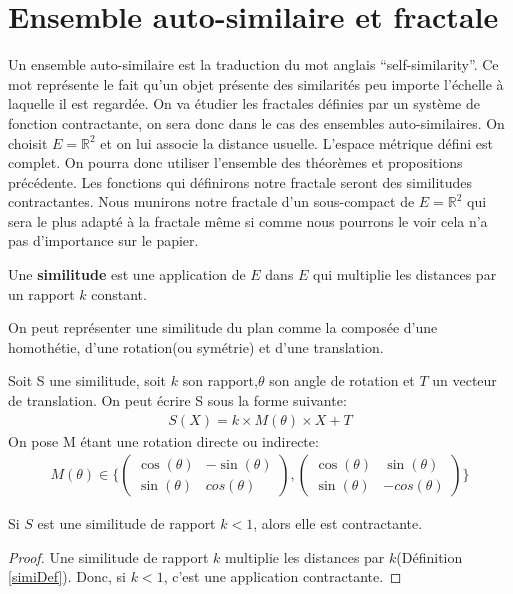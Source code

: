 \documentclass[a4paper, 12pt]{report}
\begin{document}
		\section{Ensemble auto-similaire et fractale}
		\label{FracEns}
			Un ensemble auto-similaire est la traduction du mot anglais ``self-similarity''. Ce mot représente le fait qu'un objet présente des similarités peu importe l'échelle à laquelle il est regardée. On va étudier les fractales définies par un système de fonction contractante, on sera donc dans le cas des ensembles auto-similaires. On choisit $E=\mathds{R}^2$ et on lui associe la distance usuelle. L'espace métrique défini est complet. On pourra donc utiliser l'ensemble des théorèmes et propositions précédente. Les fonctions qui définirons notre fractale seront des similitudes contractantes. Nous munirons notre fractale d'un sous-compact de $E=\mathds{R}^2$ qui sera le plus adapté à la fractale même si comme nous pourrons le voir cela n'a pas d'importance sur le papier. 
			\begin{definition}
			\label{simiDef}
				Une \textbf{similitude} est une application de $E$ dans $E$ qui multiplie les distances par un rapport $k$ constant.
			\end{definition}
			\begin{remark*}
				On peut représenter une similitude du plan comme la composée d'une homothétie, d'une rotation(ou symétrie) et d'une translation.
			\end{remark*}
			\begin{prop}
				Soit S une similitude, soit $k$ son rapport,$\theta$ son angle de rotation et $T$ un vecteur de translation. On peut écrire S sous la forme suivante:
				\begin{align*}
					S(X)=k\times M(\theta)\times X+T
				\end{align*}
				On pose M étant une rotation directe ou indirecte:
				\begin{align*}
					M(\theta)\in\Bigg\{
					\begin{pmatrix}
						\cos(\theta) & -\sin(\theta) \\
						\sin(\theta) & cos(\theta) 
					\end{pmatrix}
					,
					\begin{pmatrix}
						\cos(\theta) & \sin(\theta) \\
						\sin(\theta) & -cos(\theta) 
					\end{pmatrix}
					\Bigg\}
				\end{align*}
			\end{prop}
			\begin{prop}
				
				Si $S$ est une similitude de rapport $k<1$, alors elle est contractante.
			\end{prop}
			\begin{proof}
				Une similitude de rapport $k$ multiplie les distances par $k$(Définition \ref{simiDef}). Donc, si $k<1$, c'est une application contractante.
			\end{proof}
\end{document}
